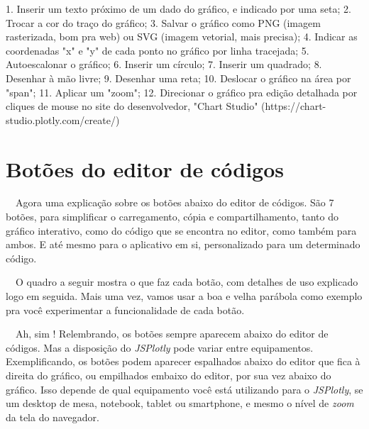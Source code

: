 \documentclass[
  portuguese,
  letterpaper,
  DIV=11,
  numbers=noendperiod]{scrreprt}
\newenvironment{Shaded}{\begin{snugshade}}{\end{snugshade}}
\newcommand{\ErrorTok}[1]{\textcolor[rgb]{0.68,0.00,0.00}{#1}}
\newcommand{\FloatTok}[1]{\textcolor[rgb]{0.68,0.00,0.00}{#1}}
\newcommand{\FunctionTok}[1]{\textcolor[rgb]{0.28,0.35,0.67}{#1}}
\newcommand{\NormalTok}[1]{\textcolor[rgb]{0.00,0.23,0.31}{#1}}
\newcommand{\SpecialCharTok}[1]{\textcolor[rgb]{0.37,0.37,0.37}{#1}}
\newcommand{\StringTok}[1]{\textcolor[rgb]{0.13,0.47,0.30}{#1}}
\begin{document}
\begin{Shaded}
\begin{Highlighting}[]
\FloatTok{1.}\NormalTok{ Inserir um texto próximo de um dado do gráfico, e indicado por uma seta;}
\FloatTok{2.}\NormalTok{ Trocar a cor do traço do gráfico;}
\FloatTok{3.}\NormalTok{ Salvar o gráfico como }\FunctionTok{PNG}\NormalTok{ (imagem rasterizada, bom pra web) ou }\FunctionTok{SVG}\NormalTok{ (imagem vetorial, mais precisa);}
\FloatTok{4.}\NormalTok{ Indicar as coordenadas }\StringTok{"x"}\NormalTok{ e }\StringTok{"y"}\NormalTok{ de cada ponto no gráfico por linha tracejada;}
\FloatTok{5.}\NormalTok{ Autoescalonar o gráfico;}
\FloatTok{6.}\NormalTok{ Inserir um círculo;}
\FloatTok{7.}\NormalTok{ Inserir um quadrado;}
\FloatTok{8.}\NormalTok{ Desenhar à mão livre;}
\FloatTok{9.}\NormalTok{ Desenhar uma reta;}
\FloatTok{10.}\NormalTok{ Deslocar o gráfico na área por }\StringTok{"span"}\NormalTok{;}
\FloatTok{11.}\NormalTok{ Aplicar um }\StringTok{"zoom"}\NormalTok{;}
\FloatTok{12.}\NormalTok{ Direcionar o gráfico pra edição detalhada por cliques de mouse no site do desenvolvedor, }\StringTok{"Chart Studio"}\NormalTok{ (https}\SpecialCharTok{:}\ErrorTok{//}\NormalTok{chart}\SpecialCharTok{{-}}\NormalTok{studio.plotly.com}\SpecialCharTok{/}\NormalTok{create}\SpecialCharTok{/}\NormalTok{)}
\end{Highlighting}
\end{Shaded}

\section{Botões do editor de
códigos}\label{botuxf5es-do-editor-de-cuxf3digos}

~~Agora uma explicação sobre os botões abaixo do editor de códigos. São
7 botões, para simplificar o carregamento, cópia e compartilhamento,
tanto do gráfico interativo, como do código que se encontra no editor,
como também para ambos. E até mesmo para o aplicativo em si,
personalizado para um determinado código.

~~O quadro a seguir mostra o que faz cada botão, com detalhes de uso
explicado logo em seguida. Mais uma vez, vamos usar a boa e velha
parábola como exemplo pra você experimentar a funcionalidade de cada
botão.

~~Ah, sim ! Relembrando, os botões sempre aparecem abaixo do editor de
códigos. Mas a disposição do \emph{JSPlotly} pode variar entre
equipamentos. Exemplificando, os botões podem aparecer espalhados abaixo
do editor que fica à direita do gráfico, ou empilhados embaixo do
editor, por sua vez abaixo do gráfico. Isso depende de qual equipamento
você está utilizando para o \emph{JSPlotly}, se um desktop de mesa,
notebook, tablet ou smartphone, e mesmo o nível de \emph{zoom} da tela
do navegador.
\end{document}
